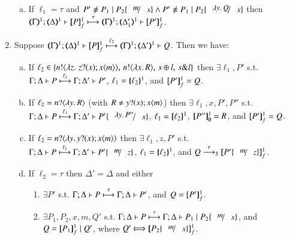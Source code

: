 \begin{proposition}
\begin{enumerate}[1.]
\begin{enumerate}[a)]
			\item If $\ell_1 = \tau$
			and $P' \not\scong P_1 \Par P_2\subst{m}{x} \land P' \not\scong P_1 \Par P_2\subst{\abs{y}Q}{x}$
			then \\
			$\stytra{\mapt{\Gamma}^{1}}{\tau}{\mapt{\Delta}^{1}}{\pmapp{P}{1}{f}}{\mapt{\Delta'_1}^{1}}{ \pmapp{P'}{1}{f}
			}$.
			\end{enumerate}
			
		\item Suppose $\stytra{\mapt{\Gamma}^{1}}{\ell_2}{\mapt{\Delta}^{1}}{\pmapp{P}{1}{f}}{\mapt{\Delta'}^{1}}{Q}$.
		Then we have:
			\begin{enumerate}[a)]
		    \item 
		    If $\ell_2 \in \{\bactout{n}{\abs{z}{\,\binp{z}{x} \appl{x}{m}}}, \,\bactout{n}{\abs{x}R}, \,\bactsel{s}{l}, \,\bactbra{s}{l}   \}$
			then $\exists \ell_1, P'$ s.t. \\
			$\stytra{ \Gamma }{\ell_1}{ \Delta }{ P}{ \Delta' }{ P'}$, 
			$\ell_1 = \mapa{\ell_2}^{1}$, 
			and
			$\map{P'}^{1}_f = Q$.
			
			\item 
		    If $\ell_2 = \bactinp{n}{\abs{y}R}$ (with $R \neq \binp{y}{x} \appl{x}{m}$)
			then $\exists \ell_1, x, P', P''$ s.t. \\
			$\stytra{ \Gamma }{\ell_1}{ \Delta }{ P}{ \Delta' }{ P'\subst{\abs{y}P''}{x}}$, 
			$\ell_1 = \mapa{\ell_2}^{1}$, 
						$\map{P''}^{1}_\es = R$, and 			$\map{P'}^{1}_f = Q$.		
						
			\item 
		    If $\ell_2 = \bactinp{n}{\abs{y}\binp{y}{x} \appl{x}{m}}$ 
			then $\exists \ell_1, z, P'$ s.t. \\
			$\stytra{ \Gamma }{\ell_1}{ \Delta }{ P}{ \Delta' }{ P'\subst{m}{z}}$, 
			$\ell_1 = \mapa{\ell_2}^{1}$,
			and 
			$Q \by{\tau}_3  \map{P'\subst{m}{z}}^{1}_f$.	
		
			
			\item 
		    If $\ell_2 = \tau$ 
			then $\Delta' = \Delta$ and 
			either
			\begin{enumerate}[-]
			\item $\exists P'$ s.t. 
			$\stytra{ \Gamma }{\tau}{ \Delta }{ P}{ \Delta}{ P'}$, and $Q = \map{P'}^{1}_f$.	

			\item $\exists P_1, P_2, x, m, Q'$ s.t. 
			$\stytra{ \Gamma }{\tau}{ \Delta }{ P}{ \Delta}{ P_1 \Par P_2\subst{m}{x} }$, and 
			$Q = \map{P_1}^{1}_f \Par Q'$, where $Q'  \Hby{} \map{P_2\subst{m}{x}}^{1}_f$.


\end{enumerate}
\end{enumerate}
\end{enumerate}
\end{proposition}
